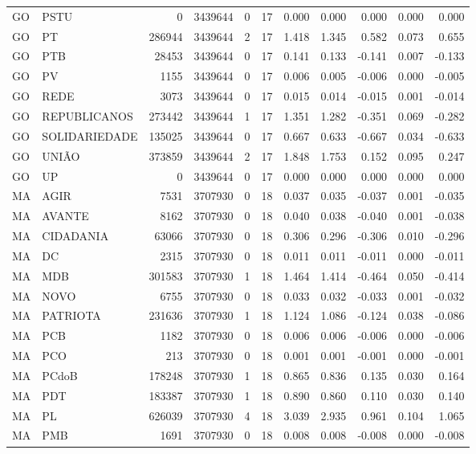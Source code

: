 \begin{landscape}
\begin{longtable}{llrrrrrrrrr}
GO & PSTU & 0 & 3439644 & 0 & 17 & 0.000 & 0.000 & 0.000 & 0.000 & 0.000 \\
GO & PT & 286944 & 3439644 & 2 & 17 & 1.418 & 1.345 & 0.582 & 0.073 & 0.655 \\
GO & PTB & 28453 & 3439644 & 0 & 17 & 0.141 & 0.133 & -0.141 & 0.007 & -0.133 \\
GO & PV & 1155 & 3439644 & 0 & 17 & 0.006 & 0.005 & -0.006 & 0.000 & -0.005 \\
GO & REDE & 3073 & 3439644 & 0 & 17 & 0.015 & 0.014 & -0.015 & 0.001 & -0.014 \\
GO & REPUBLICANOS & 273442 & 3439644 & 1 & 17 & 1.351 & 1.282 & -0.351 & 0.069 & -0.282 \\
GO & SOLIDARIEDADE & 135025 & 3439644 & 0 & 17 & 0.667 & 0.633 & -0.667 & 0.034 & -0.633 \\
GO & UNIÃO & 373859 & 3439644 & 2 & 17 & 1.848 & 1.753 & 0.152 & 0.095 & 0.247 \\
GO & UP & 0 & 3439644 & 0 & 17 & 0.000 & 0.000 & 0.000 & 0.000 & 0.000 \\
MA & AGIR & 7531 & 3707930 & 0 & 18 & 0.037 & 0.035 & -0.037 & 0.001 & -0.035 \\
MA & AVANTE & 8162 & 3707930 & 0 & 18 & 0.040 & 0.038 & -0.040 & 0.001 & -0.038 \\
MA & CIDADANIA & 63066 & 3707930 & 0 & 18 & 0.306 & 0.296 & -0.306 & 0.010 & -0.296 \\
MA & DC & 2315 & 3707930 & 0 & 18 & 0.011 & 0.011 & -0.011 & 0.000 & -0.011 \\
MA & MDB & 301583 & 3707930 & 1 & 18 & 1.464 & 1.414 & -0.464 & 0.050 & -0.414 \\
MA & NOVO & 6755 & 3707930 & 0 & 18 & 0.033 & 0.032 & -0.033 & 0.001 & -0.032 \\
MA & PATRIOTA & 231636 & 3707930 & 1 & 18 & 1.124 & 1.086 & -0.124 & 0.038 & -0.086 \\
MA & PCB & 1182 & 3707930 & 0 & 18 & 0.006 & 0.006 & -0.006 & 0.000 & -0.006 \\
MA & PCO & 213 & 3707930 & 0 & 18 & 0.001 & 0.001 & -0.001 & 0.000 & -0.001 \\
MA & PCdoB & 178248 & 3707930 & 1 & 18 & 0.865 & 0.836 & 0.135 & 0.030 & 0.164 \\
MA & PDT & 183387 & 3707930 & 1 & 18 & 0.890 & 0.860 & 0.110 & 0.030 & 0.140 \\
MA & PL & 626039 & 3707930 & 4 & 18 & 3.039 & 2.935 & 0.961 & 0.104 & 1.065 \\
MA & PMB & 1691 & 3707930 & 0 & 18 & 0.008 & 0.008 & -0.008 & 0.000 & -0.008 \\

\end{longtable}
\end{landscape}
